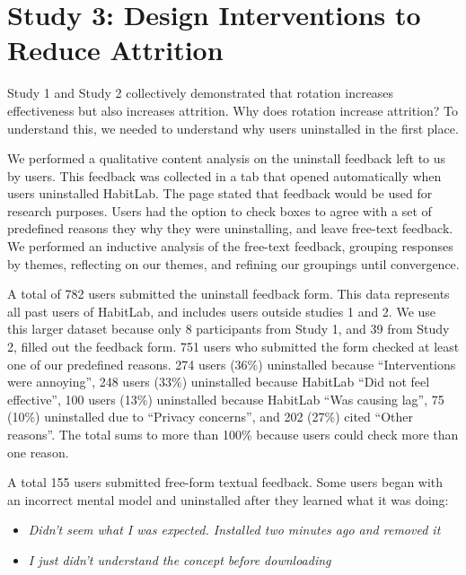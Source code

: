 \section{Study 3: Design Interventions to Reduce Attrition}

Study 1 and Study 2 collectively demonstrated that rotation increases effectiveness but also increases attrition. Why does rotation increase attrition? To understand this, we needed to understand why users uninstalled in the first place.

We performed a qualitative content analysis on the uninstall feedback left to us by users. This feedback was collected in a tab that opened automatically when users uninstalled HabitLab. The page stated that feedback would be used for research purposes. Users had the option to check boxes to agree with a set of predefined reasons they why they were uninstalling, and leave free-text feedback. We performed an inductive analysis of the free-text feedback, grouping responses by themes, reflecting on our themes, and refining our groupings until convergence.


A total of 782 users submitted the uninstall feedback form. This data represents all past users of HabitLab, and includes users outside studies 1 and 2. We use this larger dataset because only 8 participants from Study 1, and 39 from Study 2, filled out the feedback form. 751 users who submitted the form checked at least one of our predefined reasons. 274 users (36\%) uninstalled because ``Interventions were annoying'', 248 users (33\%) uninstalled because HabitLab ``Did not feel effective'', 100 users (13\%) uninstalled because HabitLab ``Was causing lag'', 75 (10\%) uninstalled due to ``Privacy concerns'', and 202 (27\%) cited ``Other reasons''. The total sums to more than 100\% because users could check more than one reason.

A total 155 users submitted free-form textual feedback. Some users began with an incorrect mental model and uninstalled after they learned what it was doing:
\begin{itemize}
\item \textit{Didn't seem what I was expected. Installed two minutes ago and removed it}
\item \textit{I just didn't understand the concept before downloading} %
\end{itemize}

